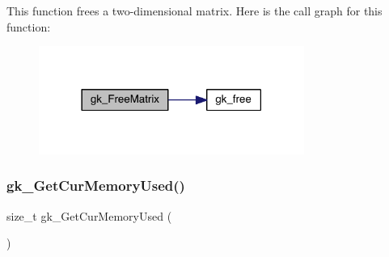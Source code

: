 This function frees a two-\/dimensional matrix. Here is the call graph for this function\+:\nopagebreak
\begin{figure}[H]
\begin{center}
\leavevmode
\includegraphics[width=246pt]{a00110_ad4ae7d30c5b5a0128a25d996755f6acb_cgraph}
\end{center}
\end{figure}
\mbox{\label{a00110_ad2327b94227019b6753b6b09400c0522}} 
\subsubsection{\texorpdfstring{gk\+\_\+\+Get\+Cur\+Memory\+Used()}{gk\_GetCurMemoryUsed()}}
{\footnotesize\ttfamily size\+\_\+t gk\+\_\+\+Get\+Cur\+Memory\+Used (\begin{DoxyParamCaption}{ }\end{DoxyParamCaption})}

